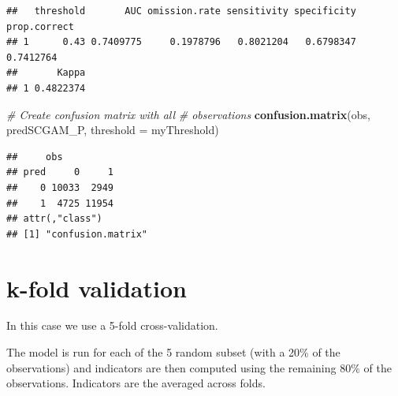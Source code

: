 \documentclass[
]{book}
\newenvironment{Shaded}{\begin{snugshade}}{\end{snugshade}}
\newcommand{\AttributeTok}[1]{\textcolor[rgb]{0.13,0.29,0.53}{#1}}
\newcommand{\CommentTok}[1]{\textcolor[rgb]{0.56,0.35,0.01}{\textit{#1}}}
\newcommand{\DecValTok}[1]{\textcolor[rgb]{0.00,0.00,0.81}{#1}}
\newcommand{\FunctionTok}[1]{\textcolor[rgb]{0.13,0.29,0.53}{\textbf{#1}}}
\newcommand{\NormalTok}[1]{#1}
\newcommand{\OtherTok}[1]{\textcolor[rgb]{0.56,0.35,0.01}{#1}}
\newcommand{\SpecialCharTok}[1]{\textcolor[rgb]{0.81,0.36,0.00}{\textbf{#1}}}
\begin{document}
\begin{verbatim}
##   threshold       AUC omission.rate sensitivity specificity prop.correct
## 1      0.43 0.7409775     0.1978796   0.8021204   0.6798347    0.7412764
##       Kappa
## 1 0.4822374
\end{verbatim}

\begin{Shaded}
\begin{Highlighting}[]
\CommentTok{\# Create confusion matrix with all}
\CommentTok{\# observations}
\FunctionTok{confusion.matrix}\NormalTok{(obs, predSCGAM\_P, }\AttributeTok{threshold =}\NormalTok{ myThreshold)}
\end{Highlighting}
\end{Shaded}

\begin{verbatim}
##     obs
## pred     0     1
##    0 10033  2949
##    1  4725 11954
## attr(,"class")
## [1] "confusion.matrix"
\end{verbatim}

\section{k-fold validation}\label{k-fold-validation}

In this case we use a 5-fold cross-validation.

\begin{Shaded}
\end{Shaded}

The model is run for each of the 5 random subset (with a 20\% of the observations) and indicators are then computed using the remaining 80\% of the observations. Indicators are the averaged across folds.
\end{document}
